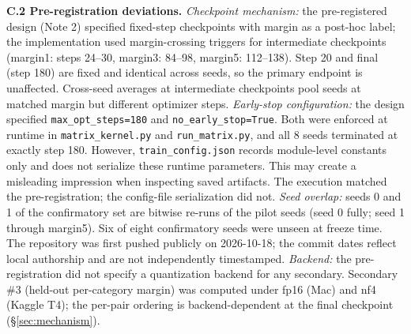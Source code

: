 \textbf{C.2 Pre-registration deviations.} \emph{Checkpoint mechanism:} the pre-registered design (Note 2) specified fixed-step checkpoints with margin as a post-hoc label; the implementation used margin-crossing triggers for intermediate checkpoints (margin1: steps 24--30, margin3: 84--98, margin5: 112--138). Step 20 and final (step 180) are fixed and identical across seeds, so the primary endpoint is unaffected. Cross-seed averages at intermediate checkpoints pool seeds at matched margin but different optimizer steps. \emph{Early-stop configuration:} the design specified \texttt{max\_opt\_steps=180} and \texttt{no\_early\_stop=True}. Both were enforced at runtime in \texttt{matrix\_kernel.py} and \texttt{run\_matrix.py}, and all 8 seeds terminated at exactly step 180. However, \texttt{train\_config.json} records module-level constants only and does not serialize these runtime parameters. This may create a misleading impression when inspecting saved artifacts. The execution matched the pre-registration; the config-file serialization did not. \emph{Seed overlap:} seeds 0 and 1 of the confirmatory set are bitwise re-runs of the pilot seeds (seed 0 fully; seed 1 through margin5). Six of eight confirmatory seeds were unseen at freeze time. The repository was first pushed publicly on 2026-10-18; the commit dates reflect local authorship and are not independently timestamped. \emph{Backend:} the pre-registration did not specify a quantization backend for any secondary. Secondary \#3 (held-out per-category margin) was computed under fp16 (Mac) and nf4 (Kaggle T4); the per-pair ordering is backend-dependent at the final checkpoint (\S\ref{sec:mechanism}).

